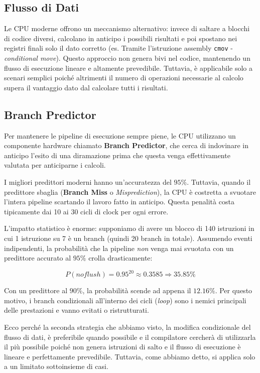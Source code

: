 \subsection*{Flusso di Dati}
Le CPU moderne offrono un meccanismo alternativo: invece di saltare a blocchi di codice diversi, calcolano in anticipo i possibili risultati e poi spostano nei registri finali solo il dato corretto (es. Tramite l'istruzione assembly \texttt{cmov} - \textit{conditional move}).
Questo approccio non genera bivi nel codice, mantenendo un flusso di esecuzione lineare e altamente prevedibile. Tuttavia, è applicabile solo a scenari semplici poiché altrimenti il numero di operazioni necessarie al calcolo supera il vantaggio dato dal calcolare tutti i risultati.
\subsection{Branch Predictor}
Per mantenere le pipeline di esecuzione sempre piene, le CPU utilizzano un componente hardware chiamato \textbf{Branch Predictor}, che cerca di indovinare in anticipo l'esito di una diramazione prima che questa venga effettivamente valutata per anticiparne i calcoli.

I migliori predittori moderni hanno un'accuratezza del $95\%$. Tuttavia, quando il predittore sbaglia (\textbf{Branch Miss} o \textit{Misprediction}), la CPU è costretta a svuotare l'intera pipeline scartando il lavoro fatto in anticipo. Questa penalità costa tipicamente dai 10 ai 30 cicli di clock per ogni errore.

L'impatto statistico è enorme: supponiamo di avere un blocco di 140 istruzioni in cui 1 istruzione su 7 è un branch (quindi 20 branch in totale). Assumendo eventi indipendenti, la probabilità che la pipeline \textit{non} venga mai svuotata con un predittore accurato al $95\%$ crolla drasticamente:

\[P(no flush) = 0.95^{20} \approx 0.3585 \Rightarrow 35.85\%\]


Con un predittore al $90\%$, la probabilità scende ad appena il $12.16\%$. Per questo motivo, i branch condizionali all'interno dei cicli (\textit{loop}) sono i nemici principali delle prestazioni e vanno evitati o ristrutturati.

Ecco perché la seconda strategia che abbiamo visto, la modifica condizionale del flusso di dati, è preferibile quando possibile e il compilatore cercherà di utilizzarla il più possibile poiché non genera istruzioni di salto e il flusso di esecuzione è lineare e perfettamente prevedibile. Tuttavia, come abbiamo detto, si applica solo a un limitato sottoinsieme di casi.

